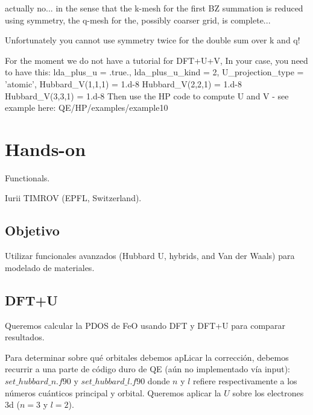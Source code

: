   actually no... in the sense that the k-mesh for the first BZ summation is reduced using symmetry, the q-mesh for the, possibly coarser grid, is complete...

  Unfortunately you cannot use symmetry twice for the double sum over k and q!


  For the moment we do not have a tutorial for DFT+U+V, In your case, you need to have this:
      lda\_plus\_u = .true.,
      lda\_plus\_u\_kind = 2,
      U\_projection\_type = 'atomic',
      Hubbard\_V(1,1,1) = 1.d-8
      Hubbard\_V(2,2,1) = 1.d-8
      Hubbard\_V(3,3,1) = 1.d-8
  Then use the HP code to compute U and V - see example here: QE/HP/examples/example10

\section{Hands-on}

 Functionals.

 Iurii TIMROV (EPFL, Switzerland).

\subsection{Objetivo}

  Utilizar funcionales avanzados (Hubbard U, hybrids, and Van der Waals) para modelado de materiales.

\subsection{DFT+U}

  Queremos calcular la PDOS de FeO usando DFT y DFT+U para comparar resultados.

  Para determinar sobre qué orbitales debemos apLicar la corrección, debemos recurrir a una parte de código duro de QE (aún no implementado vía input): $set\_hubbard\_n.f90$ y $set\_hubbard\_l.f90$ donde $n$ y $l$ refiere respectivamente a los números cuánticos principal y orbital. Queremos aplicar la $U$ sobre los electrones 3d ($n=3$ y $l=2$).

